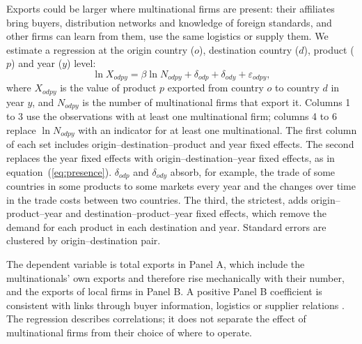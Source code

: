 Exports could be larger where multinational firms are present: their affiliates bring buyers, distribution
networks and knowledge of foreign standards, and other firms can learn from them, use the same logistics or supply
them. We estimate a regression at the origin country ($o$), destination country ($d$), product ($p$) and year ($y$)
level:
\begin{equation}\label{eq:presence}
\ln X_{odpy} = \beta \ln N_{odpy} + \delta_{odp} + \delta_{ody} + \varepsilon_{odpy},
\end{equation}
where $X_{odpy}$ is the value of product $p$ exported from country $o$ to country $d$ in year $y$, and
$N_{odpy}$ is the number of multinational firms that export it. Columns 1 to 3 use the observations with at least
one multinational firm; columns 4 to 6 replace $\ln N_{odpy}$ with an indicator for at least one multinational. The
first column of each set includes origin--destination--product and year fixed effects. The second replaces the year
fixed effects with origin--destination--year fixed effects, as in equation~(\ref{eq:presence}). $\delta_{odp}$ and
$\delta_{ody}$ absorb, for example, the trade of some countries in some products to some markets every year and the
changes over time in the trade costs between two countries. The third, the strictest, adds origin--product--year and
destination--product--year fixed effects, which remove the demand for each product in each destination and year.
Standard errors are clustered by origin--destination pair.

The dependent variable is total exports in Panel A, which include the multinationals' own exports and therefore rise mechanically with their number, and the exports of local firms in Panel B. A positive Panel B coefficient is consistent with links through buyer information,
logistics or supplier relations \citep{aitken1997,mayneris2015,carballo2021}. The regression describes correlations; it does not separate the
effect of multinational firms from their choice of where to operate.


